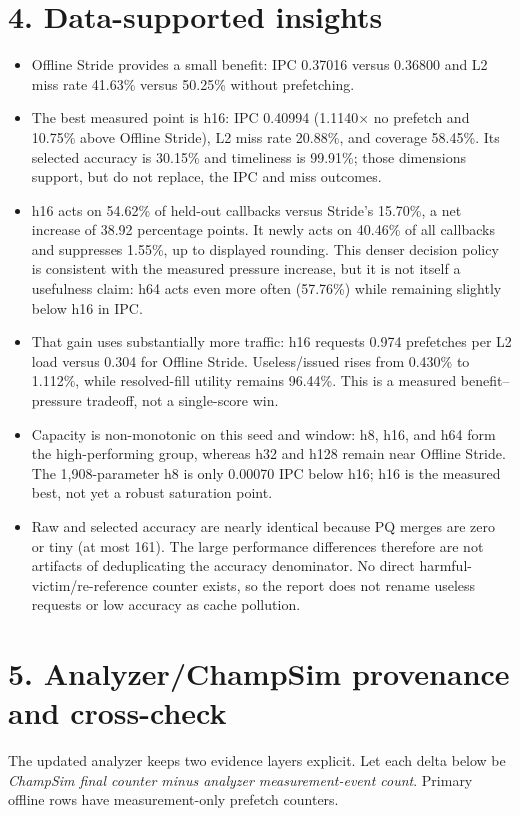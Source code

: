 \documentclass[10pt]{article}
\begin{document}
\section*{4. Data-supported insights}
\begin{infobox}[fontupper=\small]
\begin{itemize}[itemsep=1pt,topsep=1pt]
\item Offline Stride provides a small benefit: IPC 0.37016 versus 0.36800 and L2 miss rate 41.63\% versus 50.25\% without prefetching.
\item The best measured point is h16: IPC 0.40994 (1.1140$\times$ no prefetch and 10.75\% above Offline Stride), L2 miss rate 20.88\%, and coverage 58.45\%.  Its selected accuracy is 30.15\% and timeliness is 99.91\%; those dimensions support, but do not replace, the IPC and miss outcomes.
\item h16 acts on 54.62\% of held-out callbacks versus Stride's 15.70\%,
a net increase of 38.92 percentage points.  It newly acts on 40.46\% of all
callbacks and suppresses 1.55\%, up to displayed rounding.  This denser
decision policy is consistent with the measured pressure increase, but it is
not itself a usefulness claim: h64 acts even more often (57.76\%) while
remaining slightly below h16 in IPC.
\item That gain uses substantially more traffic: h16 requests 0.974 prefetches per L2 load versus 0.304 for Offline Stride.  Useless/issued rises from 0.430\% to 1.112\%, while resolved-fill utility remains 96.44\%.  This is a measured benefit--pressure tradeoff, not a single-score win.
\item Capacity is non-monotonic on this seed and window: h8, h16, and h64 form the high-performing group, whereas h32 and h128 remain near Offline Stride.  The 1,908-parameter h8 is only 0.00070 IPC below h16; h16 is the measured best, not yet a robust saturation point.
\item Raw and selected accuracy are nearly identical because PQ merges are zero or tiny (at most 161).  The large performance differences therefore are not artifacts of deduplicating the accuracy denominator.  No direct harmful-victim/re-reference counter exists, so the report does not rename useless requests or low accuracy as cache pollution.
\end{itemize}
\end{infobox}

\clearpage
\section*{5. Analyzer/ChampSim provenance and cross-check}
The updated analyzer keeps two evidence layers explicit.  Let each delta below
be \emph{ChampSim final counter minus analyzer measurement-event count}.
Primary offline rows have measurement-only prefetch counters.
\end{document}

